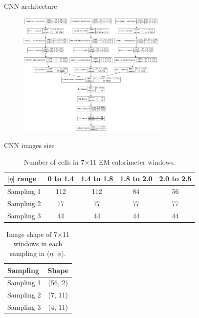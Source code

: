 \begin{frame}{CNN architecture}
\begin{figure}
    \centering
    \includegraphics[width=0.65\textwidth]{BackUp/Part6/Img/CNN_model.png}
\end{figure}
\end{frame}

\begin{frame}{CNN images size}

\begin{table}[htbp]
    \centering
    \begin{tabular}{lcccc}
    \hline\hline
        $|\eta|$ range & 0 to 1.4 & 1.4 to 1.8 & 1.8 to 2.0 & 2.0 to 2.5 \\
    \hline
        Sampling 1 & 112 & 112 & 84 & 56 \\
        Sampling 2 & 77 & 77 & 77 & 77 \\
        Sampling 3 & 44 & 44 & 44 & 44 \\
    \hline\hline
    \end{tabular}
    \caption{Number of cells in 7$\times$11 EM calorimeter windows.}
\end{table}    
    
\begin{table}[htbp]
    \centering
    \begin{tabular}{lc}
    \hline\hline
        Sampling & Shape \\
    \hline
        Sampling 1 & (56, 2)\\
        Sampling 2 & (7, 11)  \\
        Sampling 3 & (4, 11) \\
    \hline\hline
    \end{tabular}
    \caption{Image shape of 7$\times$11 windows in each sampling in ($\eta$, $\phi$).}
\end{table}
\end{frame}

